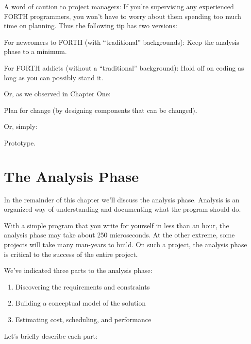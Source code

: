 A word of caution to project managers: If you're supervising any
experienced FORTH programmers, you won't have to worry about them
spending too much time on planning. Thus the following tip has two
versions:

\begin{tip}
For newcomers to FORTH (with ``traditional'' backgrounds): Keep the
analysis phase to a minimum.

For FORTH addicts (without a ``traditional'' background): Hold off on
coding as long as you can possibly stand it.
\end{tip}


\noindent Or, as we observed in Chapter One:

\begin{tip}
Plan for change (by designing components that can be changed).
\end{tip}

\noindent Or, simply:

\begin{tip}
Prototype.
\end{tip}

\section{The Analysis Phase}

\noindent In the remainder of this chapter we'll discuss the analysis phase.
Analysis is an organized way of understanding and documenting what
the program should do.

With a simple program that you write for yourself in less than an
hour, the analysis phase may take about 250 microseconds. At the other
extreme, some projects will take many man-years to build. On such a
project, the analysis phase is critical to the success of the entire project.

We've indicated three parts to the analysis phase:

\begin{enumerate}
\item Discovering the requirements and constraints
\item Building a conceptual model of the solution
\item Estimating cost, scheduling, and performance
\end{enumerate}

\noindent Let's briefly describe each part:

